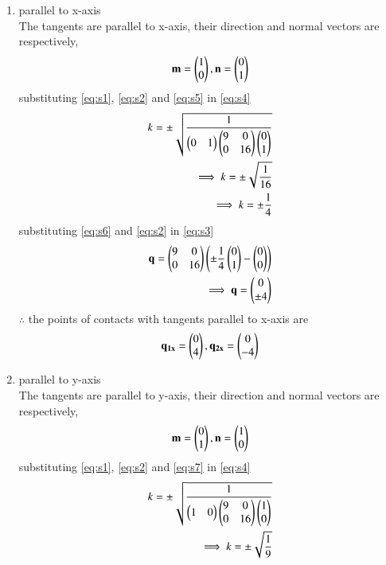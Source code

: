 \documentclass[journal,12pt,twocolumn]{IEEEtran}
\begin{document}
\begin{enumerate}[label = (\alph*)]
\item parallel to x-axis\\
The tangents are parallel to x-axis, their direction and normal vectors  are respectively,
\begin{align}
\mathbf{m}=\begin{pmatrix}1\\0\end{pmatrix}, \mathbf{n}=\begin{pmatrix}0\\1\end{pmatrix}
\label{eq:s5}
\end{align}
substituting \eqref{eq:s1}, \eqref{eq:s2} and \eqref{eq:s5} in \eqref{eq:s4}
\begin{align}
k = \pm \sqrt{\frac{1}{\begin{pmatrix}0&1\end{pmatrix}\begin{pmatrix}9&0\\0&16\end{pmatrix}\begin{pmatrix}0\\1\end{pmatrix}}}\\
\implies k = \pm \sqrt{\frac{1}{16}}\\
\label{eq:s6}
\implies k = \pm \frac{1}{4}
\end{align}
substituting \eqref{eq:s6} and \eqref{eq:s2} in \eqref{eq:s3}
\begin{align}
\mathbf{q} = \begin{pmatrix}9&0\\0&16\end{pmatrix}\left(\pm\frac{1}{4}\begin{pmatrix}0\\1\end{pmatrix}-\begin{pmatrix}0\\0\end{pmatrix}\right)\\
\implies \mathbf{q} = \begin{pmatrix}0\\ \pm4\end{pmatrix}
\end{align}
$\therefore$ the points of contacts with tangents parallel to x-axis are
\begin{align}
\mathbf{q_{1x}} = \begin{pmatrix}0\\4\end{pmatrix}, \mathbf{q_{2x}} = \begin{pmatrix}0\\-4\end{pmatrix}
\end{align} 
\item parallel to y-axis\\
The tangents are parallel to y-axis, their direction and normal vectors  are respectively,
\begin{align}
\mathbf{m}=\begin{pmatrix}0\\1\end{pmatrix}, \mathbf{n}=\begin{pmatrix}1\\0\end{pmatrix}
\label{eq:s7}
\end{align}
substituting \eqref{eq:s1}, \eqref{eq:s2} and \eqref{eq:s7} in \eqref{eq:s4}
\begin{align}
k = \pm \sqrt{\frac{1}{\myvec{1&0}\myvec{9&0\\0&16}\myvec{1\\0}}}\\
\implies k = \pm \sqrt{\frac{1}{9}}\\

\end{align}
\end{enumerate}
\end{document}
